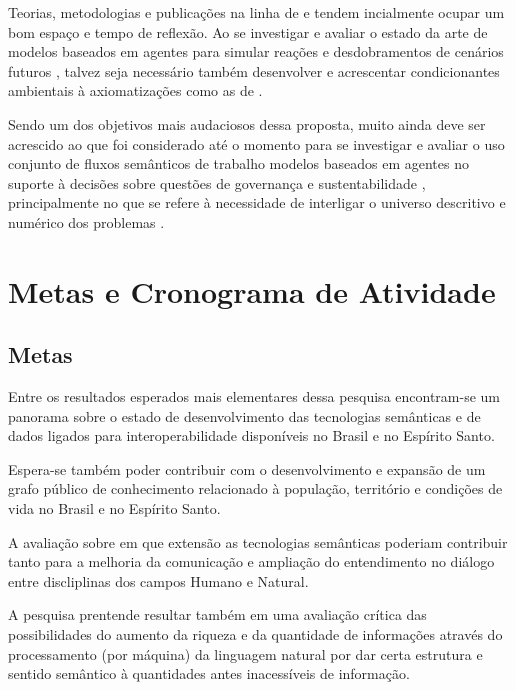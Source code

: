 \documentclass[
	12pt,				%
	openany,			%
	oneside,			%
	a4paper,			%
	english,			%
	french,				%
	spanish,			%
	brazil,				%
	]{abntex2}
\begin{document}
Teorias, metodologias e publicações na linha de  e  tendem incialmente ocupar um bom espaço e tempo de reflexão. Ao se investigar e avaliar o estado da arte de modelos baseados em agentes para simular reações e desdobramentos de cenários futuros \cite{da_silva_territory_2015}, talvez seja necessário também desenvolver e acrescentar condicionantes ambientais à axiomatizações como as de .

Sendo um dos objetivos mais audaciosos dessa proposta, muito ainda deve ser acrescido ao que foi considerado até o momento para se investigar e avaliar o uso conjunto de fluxos semânticos de trabalho \cite{mattoso_addressing_2016} modelos baseados em agentes no suporte à decisões sobre questões de governança e sustentabilidade \cite{buckingham_shum_towards_2012}, principalmente no que se refere à necessidade de interligar o universo descritivo e numérico dos problemas \cite{patton_semnext:_2015}.

\chapter{Metas e Cronograma de Atividade}
\section{Metas}

Entre os resultados esperados mais elementares dessa pesquisa encontram-se um panorama sobre o estado de desenvolvimento das tecnologias semânticas e de dados ligados para interoperabilidade disponíveis no Brasil e no Espírito Santo.

Espera-se também poder contribuir com o desenvolvimento e expansão de um grafo público de conhecimento relacionado à população, território e condições de vida no Brasil e no Espírito Santo.

A avaliação sobre em que extensão as tecnologias semânticas poderiam contribuir tanto para a melhoria da comunicação e ampliação do entendimento no diálogo entre discliplinas dos campos Humano e Natural.

A pesquisa prentende resultar também em uma avaliação crítica das possibilidades do aumento da riqueza e da quantidade de informações através do processamento (por máquina) da linguagem natural por dar certa estrutura e sentido semântico à quantidades antes inacessíveis de informação.
\end{document}
